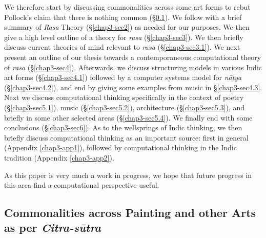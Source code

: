 We therefore start by discussing commonalities across some art forms to rebut Pollock’s claim that there is nothing common (\S\ref{chap3-sec1.3}). We follow with a brief summary of \textsl{Rasa} Theory (\S\ref{chap3-sec2}) as needed for our purposes. We then give a high level outline of a theory for \textsl{rasa} (\S\ref{chap3-sec3}). We then briefly discuss current theories of mind relevant to \textsl{rasa} (\S\ref{chap3-sec3.1}). We next present an outline of our thesis towards a contemporaneous computational theory of \textsl{rasa} (\S\ref{chap3-sec4}). Afterwards, we discuss structuring models in various Indic art forms (\S\ref{chap3-sec4.1}) followed by a computer systems model for \textsl{nāṭya} (\S\ref{chap3-sec4.2}), and end by giving some examples from music in \S\ref{chap3-sec4.3}. Next we discuss computational thinking specifically in the context of poetry (\S\ref{chap3-sec5.1}), music (\S\ref{chap3-sec5.2}), architecture (\S\ref{chap3-sec5.3}), and briefly in some other selected areas (\S\ref{chap3-sec5.4}). We finally end with some conclusions (\S\ref{chap3-sec6}). As to the wellsprings of Indic thinking, we then briefly discuss computational thinking as an important source: first in general (Appendix \ref{chap3-app1}), followed by computational thinking in the Indic tradition (Appendix \ref{chap3-app2}). 

As this paper is very much a work in progress, we hope that future progress in this area find a computational perspective useful.

\subsection{Commonalities across Painting and other Arts as per \textsl{Citra-sūtra}}\label{chap3-sec1.3}


